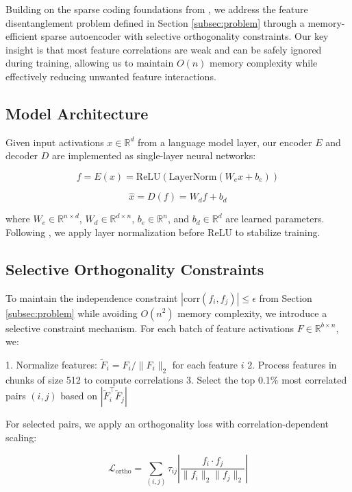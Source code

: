 \documentclass{article} %
\begin{document}
Building on the sparse coding foundations from \cite{Olshausen1996EmergenceOS}, we address the feature disentanglement problem defined in Section \ref{subsec:problem} through a memory-efficient sparse autoencoder with selective orthogonality constraints. Our key insight is that most feature correlations are weak and can be safely ignored during training, allowing us to maintain $O(n)$ memory complexity while effectively reducing unwanted feature interactions.

\subsection{Model Architecture}
Given input activations $x \in \mathbb{R}^d$ from a language model layer, our encoder $E$ and decoder $D$ are implemented as single-layer neural networks:

\begin{equation}
    f = E(x) = \text{ReLU}(\text{LayerNorm}(W_ex + b_e))
\end{equation}

\begin{equation}
    \hat{x} = D(f) = W_df + b_d
\end{equation}

where $W_e \in \mathbb{R}^{n \times d}$, $W_d \in \mathbb{R}^{d \times n}$, $b_e \in \mathbb{R}^n$, and $b_d \in \mathbb{R}^d$ are learned parameters. Following \cite{ba2016layer}, we apply layer normalization before ReLU to stabilize training.

\subsection{Selective Orthogonality Constraints}
To maintain the independence constraint $|\text{corr}(f_i, f_j)| \leq \epsilon$ from Section \ref{subsec:problem} while avoiding $O(n^2)$ memory complexity, we introduce a selective constraint mechanism. For each batch of feature activations $F \in \mathbb{R}^{b \times n}$, we:

1. Normalize features: $\tilde{F}_i = F_i / \|F_i\|_2$ for each feature $i$
2. Process features in chunks of size 512 to compute correlations
3. Select the top 0.1\% most correlated pairs $(i,j)$ based on $|\tilde{F}_i^\top \tilde{F}_j|$

For selected pairs, we apply an orthogonality loss with correlation-dependent scaling:

\begin{equation}
    \mathcal{L}_{\text{ortho}} = \sum_{(i,j)} \tau_{ij} \left|\frac{f_i \cdot f_j}{\|f_i\|_2\|f_j\|_2}\right|
\end{equation}
\end{document}
